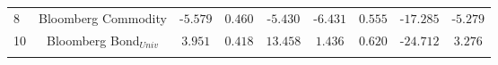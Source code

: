 \begin{table}[!htbp]
\begin{adjustbox}{width=\textwidth}
\begin{tabular}{@{\extracolsep{5pt}} Hcccccccc}
8 & Bloomberg Commodity & -$5.579$ & $0.460$ & -$5.430$ & -$6.431$ & $0.555$ & -$17.285$ & -$5.279$ \\ 
10 & Bloomberg Bond$_{Univ}$ & $3.951$ & $0.418$ & $13.458$ & $1.436$ & $0.620$ & -$24.712$ & $3.276$ \\ 
\hline \\[-1.8ex] 
\end{tabular} 
\end{adjustbox}
\end{table} 
